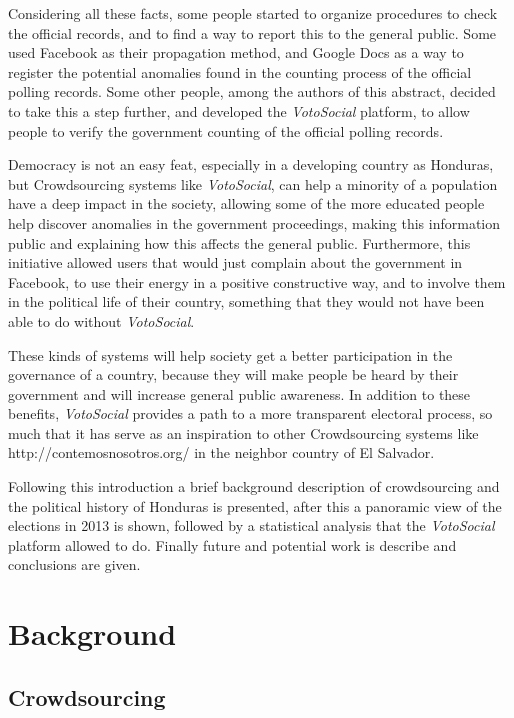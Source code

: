 \documentclass[a4paper,10pt]{article}
\begin{document}
Considering all these facts, some people started to organize procedures to check the official records, and to find a way to report this to the general public. Some used Facebook as their propagation method, and Google Docs as a way to register the potential anomalies found in the counting process of the official polling records. Some other people, among the authors of this abstract, decided to take this a step further, and developed the \textit{VotoSocial} platform, to allow people to verify the government counting of the official polling records.

Democracy is not an easy feat, especially in a developing country as Honduras, but Crowdsourcing systems like \textit{VotoSocial}, can help a minority of a population have a deep impact in the society, allowing some of the more educated people help discover anomalies in the government proceedings, making this information public and explaining how this affects the general public. Furthermore, this initiative allowed users that would just complain about the government in Facebook, to use their energy in a positive constructive way, and to involve them in the political life of their country, something that they would not have been able to do without \textit{VotoSocial}.

These kinds of systems will help society get a better participation in the governance of a country, because they will make people be heard by their government and will increase general public awareness. In addition to these benefits, \textit{VotoSocial} provides a path to a more transparent electoral process, so much that it has serve as an inspiration to other Crowdsourcing systems like http://contemosnosotros.org/ in the neighbor country of El Salvador. 

Following this introduction a brief background description of crowdsourcing and the political history of Honduras is presented, after this a panoramic view of the elections in 2013 is shown, followed by a statistical analysis that the \textit{VotoSocial} platform allowed to do. Finally future and potential work is describe and conclusions are given.


\section{Background}

\subsection{Crowdsourcing}
\end{document}

